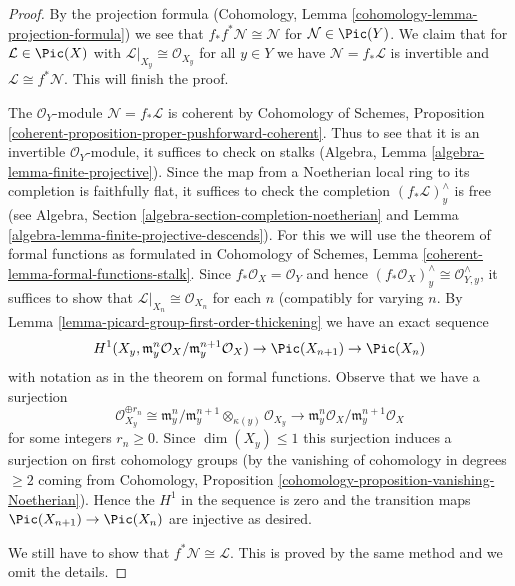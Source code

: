 \begin{proof}
By the projection formula
(Cohomology, Lemma \ref{cohomology-lemma-projection-formula})
we see that $f_*f^*\mathcal{N} \cong \mathcal{N}$ for
$\mathcal{N} \in \Pic(Y)$.
We claim that for $\mathcal{L} \in \Pic(X)$ with
$\mathcal{L}|_{X_y} \cong \mathcal{O}_{X_y}$
for all $y \in Y$ we have $\mathcal{N} = f_*\mathcal{L}$
is invertible and $\mathcal{L} \cong f^*\mathcal{N}$.
This will finish the proof.

\medskip\noindent
The $\mathcal{O}_Y$-module $\mathcal{N} = f_*\mathcal{L}$
is coherent by Cohomology of Schemes, Proposition
\ref{coherent-proposition-proper-pushforward-coherent}.
Thus to see that it is an invertible $\mathcal{O}_Y$-module,
it suffices to check on stalks (Algebra, Lemma
\ref{algebra-lemma-finite-projective}).
Since the map from a Noetherian local ring to its completion
is faithfully flat, it suffices to check the completion
$(f_*\mathcal{L})_y^\wedge$ is free (see
Algebra, Section \ref{algebra-section-completion-noetherian} and
Lemma \ref{algebra-lemma-finite-projective-descends}).
For this we will use the theorem of formal functions as formulated in
Cohomology of Schemes, Lemma \ref{coherent-lemma-formal-functions-stalk}.
Since $f_*\mathcal{O}_X = \mathcal{O}_Y$ and hence
$(f_*\mathcal{O}_X)_y^\wedge \cong \mathcal{O}_{Y, y}^\wedge$,
it suffices to show that $\mathcal{L}|_{X_n} \cong \mathcal{O}_{X_n}$
for each $n$ (compatibly for varying $n$.
By Lemma \ref{lemma-picard-group-first-order-thickening}
we have an exact sequence
$$
H^1(X_y, \mathfrak m_y^n\mathcal{O}_X/\mathfrak m_y^{n + 1}\mathcal{O}_X)
\to \Pic(X_{n + 1}) \to \Pic(X_n)
$$
with notation as in the theorem on formal functions.
Observe that we have a surjection
$$
\mathcal{O}_{X_y}^{\oplus r_n} \cong
\mathfrak m_y^n/\mathfrak m_y^{n + 1} \otimes_{\kappa(y)} \mathcal{O}_{X_y}
\longrightarrow
\mathfrak m_y^n\mathcal{O}_X/\mathfrak m_y^{n + 1}\mathcal{O}_X
$$
for some integers $r_n \geq 0$.
Since $\dim(X_y) \leq 1$ this surjection induces a surjection
on first cohomology groups (by the vanishing of cohomology in degrees $\geq 2$
coming from Cohomology, Proposition
\ref{cohomology-proposition-vanishing-Noetherian}).
Hence the $H^1$ in the sequence is zero and the transition maps
$\Pic(X_{n + 1}) \to \Pic(X_n)$ are injective as desired.

\medskip\noindent
We still have to show that $f^*\mathcal{N} \cong \mathcal{L}$.
This is proved by the same method and we omit the details.
\end{proof}









